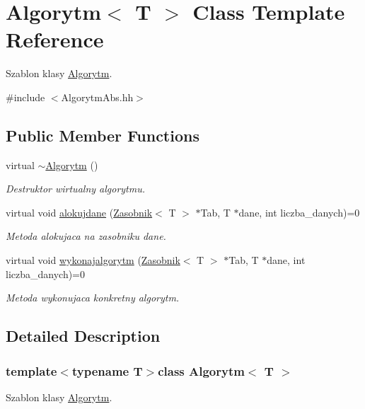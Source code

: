 \hypertarget{a00001}{}\section{Algorytm$<$ T $>$ Class Template Reference}
\label{a00001}


Szablon klasy \hyperlink{a00001}{Algorytm}.  




{\ttfamily \#include $<$Algorytm\+Abs.\+hh$>$}

\subsection*{Public Member Functions}
\begin{DoxyCompactItemize}
\item 
virtual \hyperlink{a00001_a03e656bf3d65ffb3428bd153c9faaadb}{$\sim$\+Algorytm} ()
\begin{DoxyCompactList}\small\item\em Destruktor wirtualny algorytmu. \end{DoxyCompactList}\item 
virtual void \hyperlink{a00001_a1e83fd87a20fd0a13ebbf1c81e457b61}{alokujdane} (\hyperlink{a00019}{Zasobnik}$<$ T $>$ $\ast$Tab, T $\ast$dane, int liczba\+\_\+danych)=0
\begin{DoxyCompactList}\small\item\em Metoda alokujaca na zasobniku dane. \end{DoxyCompactList}\item 
virtual void \hyperlink{a00001_ae97a52b1a728be1a819c9e9815f424e7}{wykonajalgorytm} (\hyperlink{a00019}{Zasobnik}$<$ T $>$ $\ast$Tab, T $\ast$dane, int liczba\+\_\+danych)=0
\begin{DoxyCompactList}\small\item\em Metoda wykonujaca konkretny algorytm. \end{DoxyCompactList}\end{DoxyCompactItemize}


\subsection{Detailed Description}
\subsubsection*{template$<$typename T$>$class Algorytm$<$ T $>$}

Szablon klasy \hyperlink{a00001}{Algorytm}. 

